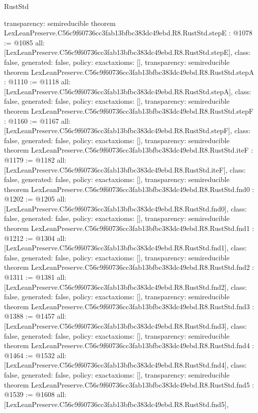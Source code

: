 \begin{lexlean}{RustStd}
\begin{coremodule}
{  transparency: semireducible
}
theorem LexLeanPreserve.C56c9f60736cc3fab13bfbc383dc49ebd.R8.RustStd.stepE : @1078 := @1085 {
  all: [LexLeanPreserve.C56c9f60736cc3fab13bfbc383dc49ebd.R8.RustStd.stepE],
  class: false,
  generated: false,
  policy: exact{axioms: []},
  transparency: semireducible
}
theorem LexLeanPreserve.C56c9f60736cc3fab13bfbc383dc49ebd.R8.RustStd.stepA : @1110 := @1118 {
  all: [LexLeanPreserve.C56c9f60736cc3fab13bfbc383dc49ebd.R8.RustStd.stepA],
  class: false,
  generated: false,
  policy: exact{axioms: []},
  transparency: semireducible
}
theorem LexLeanPreserve.C56c9f60736cc3fab13bfbc383dc49ebd.R8.RustStd.stepF : @1160 := @1167 {
  all: [LexLeanPreserve.C56c9f60736cc3fab13bfbc383dc49ebd.R8.RustStd.stepF],
  class: false,
  generated: false,
  policy: exact{axioms: []},
  transparency: semireducible
}
theorem LexLeanPreserve.C56c9f60736cc3fab13bfbc383dc49ebd.R8.RustStd.iteF : @1179 := @1182 {
  all: [LexLeanPreserve.C56c9f60736cc3fab13bfbc383dc49ebd.R8.RustStd.iteF],
  class: false,
  generated: false,
  policy: exact{axioms: []},
  transparency: semireducible
}
theorem LexLeanPreserve.C56c9f60736cc3fab13bfbc383dc49ebd.R8.RustStd.fnd0 : @1202 := @1205 {
  all: [LexLeanPreserve.C56c9f60736cc3fab13bfbc383dc49ebd.R8.RustStd.fnd0],
  class: false,
  generated: false,
  policy: exact{axioms: []},
  transparency: semireducible
}
theorem LexLeanPreserve.C56c9f60736cc3fab13bfbc383dc49ebd.R8.RustStd.fnd1 : @1212 := @1304 {
  all: [LexLeanPreserve.C56c9f60736cc3fab13bfbc383dc49ebd.R8.RustStd.fnd1],
  class: false,
  generated: false,
  policy: exact{axioms: []},
  transparency: semireducible
}
theorem LexLeanPreserve.C56c9f60736cc3fab13bfbc383dc49ebd.R8.RustStd.fnd2 : @1311 := @1381 {
  all: [LexLeanPreserve.C56c9f60736cc3fab13bfbc383dc49ebd.R8.RustStd.fnd2],
  class: false,
  generated: false,
  policy: exact{axioms: []},
  transparency: semireducible
}
theorem LexLeanPreserve.C56c9f60736cc3fab13bfbc383dc49ebd.R8.RustStd.fnd3 : @1388 := @1457 {
  all: [LexLeanPreserve.C56c9f60736cc3fab13bfbc383dc49ebd.R8.RustStd.fnd3],
  class: false,
  generated: false,
  policy: exact{axioms: []},
  transparency: semireducible
}
theorem LexLeanPreserve.C56c9f60736cc3fab13bfbc383dc49ebd.R8.RustStd.fnd4 : @1464 := @1532 {
  all: [LexLeanPreserve.C56c9f60736cc3fab13bfbc383dc49ebd.R8.RustStd.fnd4],
  class: false,
  generated: false,
  policy: exact{axioms: []},
  transparency: semireducible
}
theorem LexLeanPreserve.C56c9f60736cc3fab13bfbc383dc49ebd.R8.RustStd.fnd5 : @1539 := @1608 {
  all: [LexLeanPreserve.C56c9f60736cc3fab13bfbc383dc49ebd.R8.RustStd.fnd5],
}
\end{coremodule}
\end{lexlean}
